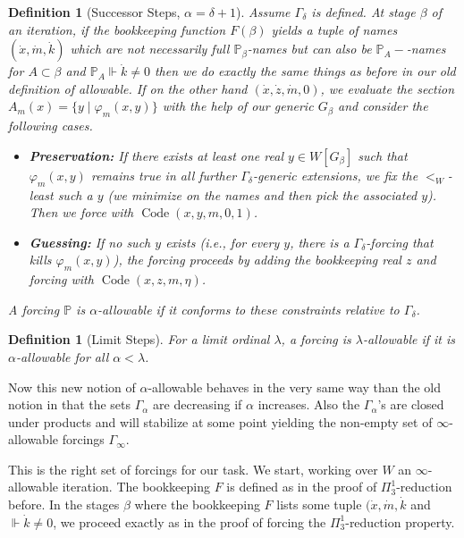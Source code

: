\documentclass[a4paper,11pt]{article}
\newtheorem{definition}[theorem]{Definition}
\newcommand{\forceP}{\mathbb{P}}
\begin{document}
\begin{definition}[Successor Steps, $\alpha = \delta + 1$]
Assume $\Gamma_\delta$ is defined. At stage $\beta$ of an iteration, if the bookkeeping function $F(\beta)$ yields a tuple of names
$(\dot{x}, \dot{m},\dot{k})$ which are not necessarily full $\forceP_{\beta}$-names but can also be $\forceP_{A}-$-names for $A \subset \beta$ and $\forceP_{A} \Vdash \dot{k} \ne 0$ then we do exactly the same things as before in our old definition of allowable. If on the other hand 
$(\dot{x}, \dot{z}, \dot{m}, 0)$, we evaluate the section $A_m(x) = \{ y \mid \varphi_m(x,y) \}$ with the help of our generic $G_{\beta}$ and consider the following cases.
\begin{itemize}
    \item \textbf{Preservation:} If there exists at least one real $y \in W[G_{\beta}]$ such that $\varphi_m(x,y)$ remains true in \emph{all} further $\Gamma_\delta$-generic extensions, we fix the $<_W$-least such a $y$ (we minimize on the names and then pick the associated $y$). Then we force with $\operatorname{Code}(x,y,m,0,1)$.
    \item \textbf{Guessing:} If no such $y$ exists (i.e., for every $y$, there is a $\Gamma_\delta$-forcing that kills $\varphi_m(x,y)$), the forcing proceeds by adding the bookkeeping real $z$ and forcing with $\operatorname{Code}(x,z,m, \eta)$.
\end{itemize}
A forcing $\mathbb{P}$ is $\alpha$-allowable if it conforms to these constraints relative to $\Gamma_\delta$.
\end{definition}

\begin{definition}[Limit Steps]
For a limit ordinal $\lambda$, a forcing is $\lambda$-allowable if it is $\alpha$-allowable for all $\alpha < \lambda$.
\end{definition}


Now this new notion of $\alpha$-allowable behaves in the very same way than the old notion in that the sets $\Gamma_{\alpha}$ are decreasing if $\alpha$ increases. Also the $\Gamma_{\alpha}$'s are closed under products and will stabilize at some point yielding the non-empty set of $\infty$-allowable forcings $\Gamma_{\infty}$.

This is the right set of forcings for our task. We start, working over $W$ an $\infty$-allowable iteration. The bookkeeping $F$ is defined as in the proof of $\Pi^1_3$-reduction before. In the stages $\beta$ where the bookkeeping $F$ lists some tuple $(\dot{x},\dot{m},\dot{k}$ and $\Vdash \dot{k} \ne 0$, we proceed exactly as in the proof of forcing the $\Pi^1_3$-reduction property.
\end{document}
